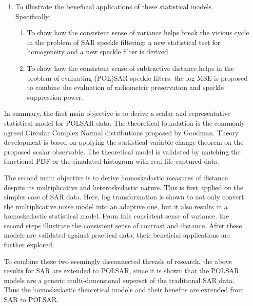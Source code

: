 \begin{enumerate}
\begin{enumerate}
                \item To illustrate the beneficial applications of these
                statistical models. Specifically:
                \begin{enumerate}
                \item \label{itm:filter_vicious_circle} To show how the consistent sense of variance
                helps break the vicious cycle in the problem of SAR
                speckle filtering: a new statistical test for
                homogeneity and a new speckle filter is derived.
                \item \label{itm:log_mse} To show how the consistent sense of subtractive
                distance helps in the problem of evaluating (POL)SAR
                speckle filters: the log-MSE is proposed to combine the
                evaluation of radiometric preservation and speckle
                suppression power.
                \end{enumerate}
                \end{enumerate}
\end{enumerate}

In summary, the first main objective is to derive a scalar and representative statistical model for POLSAR data.
The theoretical foundation is the commonly agreed Circular Complex Normal distributions proposed by Goodman. %
Theory development is based on applying the statistical variable change theorem on the proposed scalar observable.
The theoretical model is validated by matching the functional PDF or the simulated histogram with real-life captured data.

The second main objective is to derive homoskedastic measures of distance despite its multiplicative and heteroskedastic nature.
This is first applied on the simpler case of SAR data. %
Here, log transformation is shown to not only convert the multiplicative noise model into an adaptive one, 
  but it also results in a homoskedastic statistical model.
From this consistent sense of variance, the second steps illustrate the consistent sense of contrast and distance.
After these models are validated against practical data, their beneficial applications are further explored.

To combine these two seemingly disconnected threads of research, the above results for SAR are extended to POLSAR,
  since it is shown that the POLSAR models are a generic multi-dimensional superset of the traditional SAR data.%
Thus the homoskedastic theoretical models and their benefits are extended from SAR to POLSAR.   

